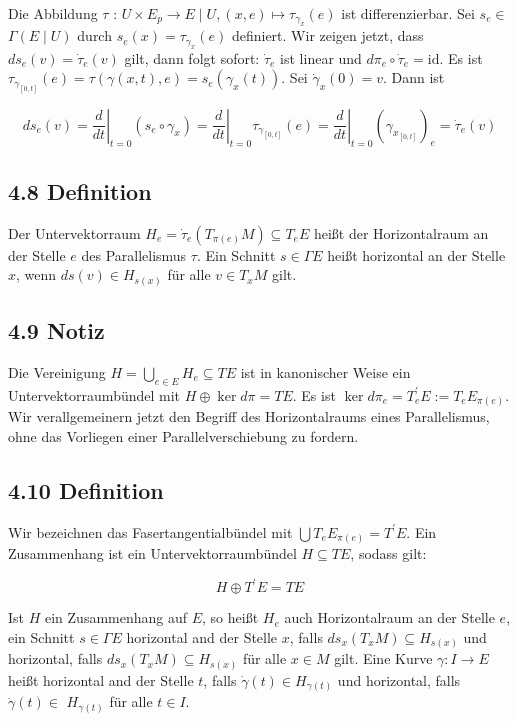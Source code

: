 \documentclass[10pt, letterpaper]{article}
\begin{document}
Die Abbildung $\tau$ : $U \times E_{p} \rightarrow E \mid U,(x, e) \mapsto \tau_{\gamma_{x}}(e)$ ist differenzierbar. Sei $s_{e} \in$ $\Gamma(E \mid U)$ durch $s_{e}(x)=\tau_{\gamma_{x}}(e)$ definiert. Wir zeigen jetzt, dass $d s_{e}(v)=\dot{\tau}_{e}(v)$ gilt, dann folgt sofort: $\dot{\tau}_{e}$ ist linear und $d \pi_{e} \circ \dot{\tau}_{e}=\mathrm{id}$. Es ist $\tau_{\gamma_{[0, t]}}(e)=\tau(\gamma(x, t), e)=s_{e}\left(\gamma_{x}(t)\right)$. Sei $\dot{\gamma}_{x}(0)=v$. Dann ist

$$
d s_{e}(v)=\left.\frac{d}{d t}\right|_{t=0}\left(s_{e} \circ \gamma_{x}\right)=\left.\frac{d}{d t}\right|_{t=0} \tau_{\gamma_{[0, t]}}(e)=\left.\frac{d}{d t}\right|_{t=0}\left(\gamma_{x_{[0, t]}}\right)_{e}=\dot{\tau}_{e}(v)
$$

\subsection*{4.8 Definition}
Der Untervektorraum $H_{e}=\dot{\tau}_{e}\left(T_{\pi(e)} M\right) \subseteq T_{e} E$ heißt der Horizontalraum an der Stelle $e$ des Parallelismus $\tau$. Ein Schnitt $s \in \Gamma E$ heißt horizontal an der Stelle $x$, wenn $d s(v) \in H_{s(x)}$ für alle $v \in T_{x} M$ gilt.

\subsection*{4.9 Notiz}
Die Vereinigung $H=\bigcup_{e \in E} H_{e} \subseteq T E$ ist in kanonischer Weise ein Untervektorraumbündel mit $H \oplus \operatorname{ker} d \pi=T E$. Es ist $\operatorname{ker} d \pi_{e}=T_{e}^{\prime} E:=T_{e} E_{\pi(e)}$.\\
Wir verallgemeinern jetzt den Begriff des Horizontalraums eines Parallelismus, ohne das Vorliegen einer Parallelverschiebung zu fordern.

\subsection*{4.10 Definition}
Wir bezeichnen das Fasertangentialbündel mit $\bigcup T_{e} E_{\pi(e)}=T^{\prime} E$. Ein Zusammenhang ist ein Untervektorraumbündel $H \subseteq T E$, sodass gilt:

$$
H \oplus T^{\prime} E=T E
$$

Ist $H$ ein Zusammenhang auf $E$, so heißt $H_{e}$ auch Horizontalraum an der Stelle $e$, ein Schnitt $s \in \Gamma E$ horizontal and der Stelle $x$, falls $d s_{x}\left(T_{x} M\right) \subseteq H_{s(x)}$ und horizontal, falls $d s_{x}\left(T_{x} M\right) \subseteq H_{s(x)}$ für alle $x \in M$ gilt. Eine Kurve $\gamma: I \rightarrow E$ heißt horizontal and der Stelle $t$, falls $\dot{\gamma}(t) \in H_{\gamma(t)}$ und horizontal, falls $\dot{\gamma}(t) \in$ $H_{\gamma(t)}$ für alle $t \in I$.
\end{document}
